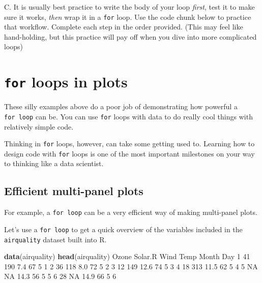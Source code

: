 \documentclass[
]{book}
\newenvironment{Shaded}{\begin{snugshade}}{\end{snugshade}}
\newcommand{\DecValTok}[1]{\textcolor[rgb]{0.00,0.00,0.81}{#1}}
\newcommand{\FloatTok}[1]{\textcolor[rgb]{0.00,0.00,0.81}{#1}}
\newcommand{\KeywordTok}[1]{\textcolor[rgb]{0.13,0.29,0.53}{\textbf{#1}}}
\newcommand{\NormalTok}[1]{#1}
\newcommand{\OtherTok}[1]{\textcolor[rgb]{0.56,0.35,0.01}{#1}}
\begin{document}
C. It is usually best practice to write the body of your loop \emph{first}, test it to make sure it works, \emph{then} wrap it in a \texttt{for} loop. Use the code chunk below to practice that workflow. Complete each step in the order provided. (This may feel like hand-holding, but this practice will pay off when you dive into more complicated loops)

\hypertarget{for-loops-in-plots}{%
\section*{\texorpdfstring{\texttt{for} loops in plots}{for loops in plots}}\label{for-loops-in-plots}}

These silly examples above do a poor job of demonstrating how powerful a \texttt{for\ loop} can be. You can use \texttt{for} loops with data to do really cool things with relatively simple code.

Thinking in \texttt{for} loops, however, can take some getting used to. Learning how to design code with \texttt{for} loops is one of the most important milestones on your way to thinking like a data scientist.

\hypertarget{efficient-multi-panel-plots}{%
\subsection*{Efficient multi-panel plots}\label{efficient-multi-panel-plots}}

For example, a \texttt{for\ loop} can be a very efficient way of making multi-panel plots.

Let's use a \texttt{for\ loop} to get a quick overview of the variables included in the \texttt{airquality} dataset built into R.

\begin{Shaded}
\begin{Highlighting}[]
\KeywordTok{data}\NormalTok{(airquality)}
\KeywordTok{head}\NormalTok{(airquality)}
\NormalTok{  Ozone Solar.R Wind Temp Month Day}
\DecValTok{1}    \DecValTok{41}     \DecValTok{190}  \FloatTok{7.4}   \DecValTok{67}     \DecValTok{5}   \DecValTok{1}
\DecValTok{2}    \DecValTok{36}     \DecValTok{118}  \FloatTok{8.0}   \DecValTok{72}     \DecValTok{5}   \DecValTok{2}
\DecValTok{3}    \DecValTok{12}     \DecValTok{149} \FloatTok{12.6}   \DecValTok{74}     \DecValTok{5}   \DecValTok{3}
\DecValTok{4}    \DecValTok{18}     \DecValTok{313} \FloatTok{11.5}   \DecValTok{62}     \DecValTok{5}   \DecValTok{4}
\DecValTok{5}    \OtherTok{NA}      \OtherTok{NA} \FloatTok{14.3}   \DecValTok{56}     \DecValTok{5}   \DecValTok{5}
\DecValTok{6}    \DecValTok{28}      \OtherTok{NA} \FloatTok{14.9}   \DecValTok{66}     \DecValTok{5}   \DecValTok{6}
\end{Highlighting}
\end{Shaded}
\end{document}
